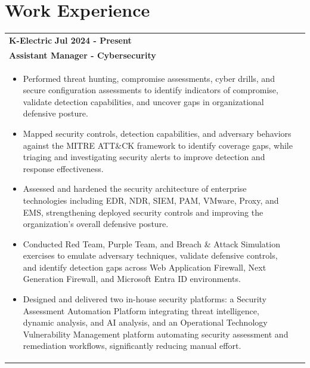 \documentclass[a4paper,8pt]{article}
\begin{document}
\section{\textbf{Work Experience}}
\begin{tabularx}{\linewidth}{ @{}l r@{} }
    \textbf{K-Electric} \hfill \textbf{Jul 2024 - Present} \\[4pt]
    \textbf{Assistant Manager - Cybersecurity}\\[4pt]
    \begin{minipage}[t]{\linewidth}
        \begin{itemize}[nosep,after=\strut, leftmargin=1em, itemsep=2pt]
            \item Performed threat hunting, compromise assessments, cyber drills, and secure configuration assessments to identify indicators of compromise, validate detection capabilities, and uncover gaps in organizational defensive posture.
            \item Mapped security controls, detection capabilities, and adversary behaviors against the MITRE ATT\&CK framework to identify coverage gaps, while triaging and investigating security alerts to improve detection and response effectiveness.
            \item Assessed and hardened the security architecture of enterprise technologies including EDR, NDR, SIEM, PAM, VMware, Proxy, and EMS, strengthening deployed security controls and improving the organization's overall defensive posture.
            \item Conducted Red Team, Purple Team, and Breach \& Attack Simulation exercises to emulate adversary techniques, validate defensive controls, and identify detection gaps across Web Application Firewall, Next Generation Firewall, and Microsoft Entra ID environments.
            \item Designed and delivered two in-house security platforms: a Security Assessment Automation Platform integrating threat intelligence, dynamic analysis, and AI analysis, and an Operational Technology Vulnerability Management platform automating security assessment and remediation workflows, significantly reducing manual effort.
    \end{itemize}
\end{minipage}
\end{tabularx}
\end{document}
